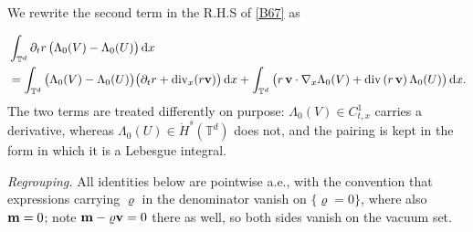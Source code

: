 \documentclass[12pt,a4paper,twoside]{article}
\newcommand{\Div}{\operatorname{div}}
\newcommand{\vr}{\varrho}
\newcommand{\vv}{\vc{v}}
\newcommand{\vc}[1]{{\bf #1}}
\newcommand{\dx}{{\,\rm d} {x}}
\newcommand{\lr}[1]{\left( #1 \right)}
\numberwithin{equation}{section}%
\newcommand{\vm}{\vc{m}}
\newcommand{\Gradx}{\nabla_x}
\newcommand{\Divx}{\operatorname{div}_x}
\newcommand{\Lambdaz}{\Lambda_0}
\begin{document}
\begin{pf}
		We rewrite the second term in the R.H.S of \eqref{B67} as 

		\begin{align*}
			&	\int_{\mathbb T^d}\partial_t r\,\big(\Lambdaz(V)-\Lambdaz(U)\big) \dx \\
			&= \int_{\mathbb T^d}\big(\Lambdaz(V)-\Lambdaz(U)\big)\big(\partial_t r+\Divx(r\vv)\big) \dx
			+ \int_{\mathbb T^d}\big( r\,\vv\cdot \Gradx \Lambdaz(V)+ \Div \lr{ r\,\vv}\Lambdaz(U)\big) \dx .
		\end{align*}
The two terms are treated differently on purpose: $\Lambdaz(V)\in C^1_{t,x}$ carries a derivative, whereas $\Lambdaz(U)\in\dot H^{s}(\mathbb T^d)$ does not, and the pairing is kept in the form in which it is a Lebesgue integral.

		
	\smallskip
	
		\noindent\emph{Regrouping.} All identities below are pointwise a.e., with the convention that expressions carrying $\vr$ in the denominator vanish on $\{\vr=0\}$, where also $\vm=0$; note $\vm-\vr\vv=0$ there as well, so both sides vanish on the vacuum set. %
	

\end{pf}
\end{document}
